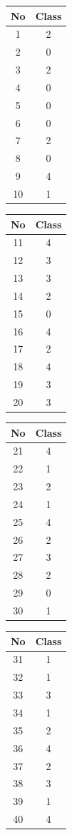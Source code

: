 \documentclass[11pt]{article}
\begin{document}
		\begin{center}
		  	\begin{table}[h]
		  		\small

		  	\centering
			\begin{tabular}[b]{| c | c|} 
				\hline
				No & Class \\
				\hline
				1 & 2 \\ 2 & 0 \\ 3 & 2 \\ 4 & 0 \\ 5 & 0 \\ 6 & 0 \\ 7 & 2 \\ 8 & 0 \\ 9 & 4 \\ 10 & 1\\ 
				\hline
			\end{tabular}
			\begin{tabular}[b]{| c | c|} 
				\hline
				No & Class \\
				\hline
				 11 & 4 \\ 12 & 3 \\ 13 &  3 \\ 14 &  2\\ 15 &  0\\ 16 & 4\\ 17 & 2\\ 18 &  4 \\ 19 &  3\\20 & 3 \\ 
				\hline
			\end{tabular}
			\begin{tabular}[b]{| c | c|} 
				\hline
				No & Class \\
				\hline
				 21 & 4 \\ 22 &  1 \\ 23 & 2 \\ 24 & 1 \\ 25 & 4 \\ 26 & 2 \\ 27 & 3 \\ 28 & 2 \\ 29 & 0 \\ 30 & 1 \\ 
				\hline
			\end{tabular}
			\begin{tabular}[b]{| c | c|} 
				\hline
				No & Class \\
				\hline
				 31 & 1 \\ 32 & 1 \\ 33 & 3 \\ 34 & 1 \\ 35 & 2 \\ 36 & 4 \\ 37 & 2 \\ 38 & 3 \\ 39 & 1 \\ 40 & 4 \\

\end{tabular}
\end{table}
\end{center}
\end{document}

